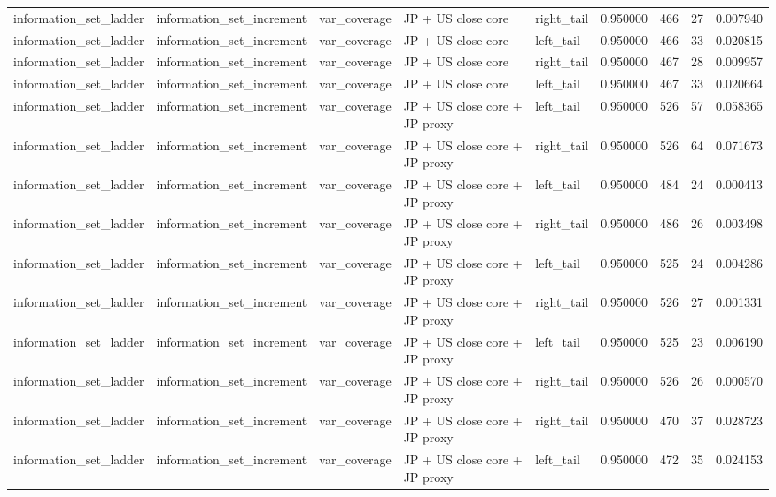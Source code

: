 \begin{tabular}{lllllrrrr}
information\_set\_ladder & information\_set\_increment & var\_coverage & JP + US close core & right\_tail & 0.950000 & 466 & 27 & 0.007940 \\
information\_set\_ladder & information\_set\_increment & var\_coverage & JP + US close core & left\_tail & 0.950000 & 466 & 33 & 0.020815 \\
information\_set\_ladder & information\_set\_increment & var\_coverage & JP + US close core & right\_tail & 0.950000 & 467 & 28 & 0.009957 \\
information\_set\_ladder & information\_set\_increment & var\_coverage & JP + US close core & left\_tail & 0.950000 & 467 & 33 & 0.020664 \\
information\_set\_ladder & information\_set\_increment & var\_coverage & JP + US close core + JP proxy & left\_tail & 0.950000 & 526 & 57 & 0.058365 \\
information\_set\_ladder & information\_set\_increment & var\_coverage & JP + US close core + JP proxy & right\_tail & 0.950000 & 526 & 64 & 0.071673 \\
information\_set\_ladder & information\_set\_increment & var\_coverage & JP + US close core + JP proxy & left\_tail & 0.950000 & 484 & 24 & 0.000413 \\
information\_set\_ladder & information\_set\_increment & var\_coverage & JP + US close core + JP proxy & right\_tail & 0.950000 & 486 & 26 & 0.003498 \\
information\_set\_ladder & information\_set\_increment & var\_coverage & JP + US close core + JP proxy & left\_tail & 0.950000 & 525 & 24 & 0.004286 \\
information\_set\_ladder & information\_set\_increment & var\_coverage & JP + US close core + JP proxy & right\_tail & 0.950000 & 526 & 27 & 0.001331 \\
information\_set\_ladder & information\_set\_increment & var\_coverage & JP + US close core + JP proxy & left\_tail & 0.950000 & 525 & 23 & 0.006190 \\
information\_set\_ladder & information\_set\_increment & var\_coverage & JP + US close core + JP proxy & right\_tail & 0.950000 & 526 & 26 & 0.000570 \\
information\_set\_ladder & information\_set\_increment & var\_coverage & JP + US close core + JP proxy & right\_tail & 0.950000 & 470 & 37 & 0.028723 \\
information\_set\_ladder & information\_set\_increment & var\_coverage & JP + US close core + JP proxy & left\_tail & 0.950000 & 472 & 35 & 0.024153 \\

\end{tabular}
